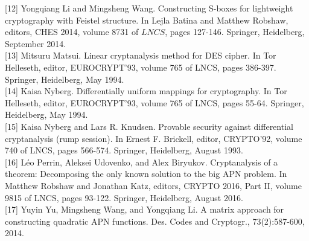 \documentclass[10pt]{article}
\begin{document}
[12] Yongqiang Li and Mingsheng Wang. Constructing S-boxes for lightweight cryptography with Feistel structure. In Lejla Batina and Matthew Robshaw, editors, CHES 2014, volume 8731 of $L N C S$, pages 127-146. Springer, Heidelberg, September 2014.\\[0pt]
[13] Mitsuru Matsui. Linear cryptanalysis method for DES cipher. In Tor Helleseth, editor, EUROCRYPT'93, volume 765 of LNCS, pages 386-397. Springer, Heidelberg, May 1994.\\[0pt]
[14] Kaisa Nyberg. Differentially uniform mappings for cryptography. In Tor Helleseth, editor, EUROCRYPT'93, volume 765 of LNCS, pages 55-64. Springer, Heidelberg, May 1994.\\[0pt]
[15] Kaisa Nyberg and Lars R. Knudsen. Provable security against differential cryptanalysis (rump session). In Ernest F. Brickell, editor, CRYPTO'92, volume 740 of LNCS, pages 566-574. Springer, Heidelberg, August 1993.\\[0pt]
[16] Léo Perrin, Aleksei Udovenko, and Alex Biryukov. Cryptanalysis of a theorem: Decomposing the only known solution to the big APN problem. In Matthew Robshaw and Jonathan Katz, editors, CRYPTO 2016, Part II, volume 9815 of LNCS, pages 93-122. Springer, Heidelberg, August 2016.\\[0pt]
[17] Yuyin Yu, Mingsheng Wang, and Yongqiang Li. A matrix approach for constructing quadratic APN functions. Des. Codes and Cryptogr., 73(2):587-600, 2014.
\end{document}
